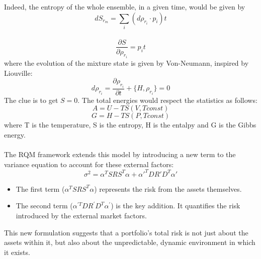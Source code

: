 \documentclass{article}
\begin{document}
Indeed, the entropy of the whole ensemble, in a given time, would be given by
\begin{equation}
    dS_{r_m} = \sum_i (d\rho_{r_i} \cdot p_i) t
\end{equation}\\
\begin{equation}
    \frac{\partial S}{\partial \rho_{r_i}} = p_i t
\end{equation}
where the evolution of the mixture state is given by Von-Neumann, inspired by Liouville:
\begin{equation}
    d\rho_{r_i} = \frac{\partial{\rho_{r_i}}}{\partial t} + \{H, \rho_{r_i}\} =0
\end{equation}
The clue is to get $S = 0$.
The total energies would respect the statistics as follows:
\begin{equation}
    A = U - TS (V,T const)
\end{equation}
\begin{equation}
    G = H - TS (P, T const)
\end{equation}
where T is the temperature, S is the entropy, H is the entalpy and G is the Gibbs energy.
\\\\
The RQM framework extends this model by introducing a new term to the variance equation to account for these external factors:
\begin{equation}
\sigma^{2}=\alpha^{T}S R S^{T}\alpha + \alpha\prime^T D R\prime D^T \alpha\prime
\end{equation}
\begin{itemize}
\item The first term ($\alpha^{T}S R S^{T}\alpha$) represents the risk from the assets themselves.
\item The second term ($\alpha^{\prime T}DR^\prime D^T \alpha^\prime$) is the key addition. It quantifies the risk introduced by the external market factors.
\end{itemize}
This new formulation suggests that a portfolio's total risk is not just about the assets within it, but also about the unpredictable, dynamic environment in which it exists.
\end{document}
